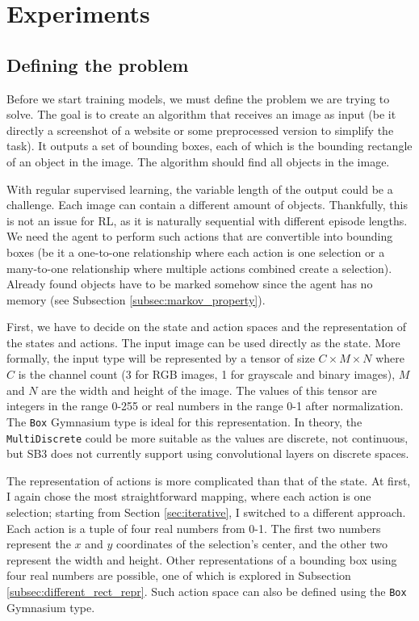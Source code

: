\documentclass[
  digital,     %
  oneside,     %
  nosansbold,  %
  nocolorbold, %
  lof,         %
  lot,         %
]{fithesis4}
\begin{document}
\chapter{Experiments}

\section{Defining the problem}
\label{sec:problem_definition}

Before we start training models, we must define the problem we are trying to solve. The goal is to create an algorithm that receives an image as input (be it directly a screenshot of a website or some preprocessed version to simplify the task). It outputs a set of bounding boxes, each of which is the bounding rectangle of an object in the image. The algorithm should find all objects in the image.

With regular supervised learning, the variable length of the output could be a challenge. Each image can contain a different amount of objects. Thankfully, this is not an issue for RL, as it is naturally sequential with different episode lengths. We need the agent to perform such actions that are convertible into bounding boxes (be it a one-to-one relationship where each action is one selection or a many-to-one relationship where multiple actions combined create a selection). Already found objects have to be marked somehow since the agent has no memory (see Subsection \ref{subsec:markov_property}).

First, we have to decide on the state and action spaces and the representation of the states and actions. The input image can be used directly as the state. More formally, the input type will be represented by a tensor of size $C\times M \times N$ where $C$ is the channel count (3 for RGB images, 1 for grayscale and binary images), $M$ and $N$ are the width and height of the image. The values of this tensor are integers in the range 0-255 or real numbers in the range 0-1 after normalization. The \texttt{Box} Gymnasium type is ideal for this representation. In theory, the \texttt{MultiDiscrete} could be more suitable as the values are discrete, not continuous, but SB3 does not currently support using convolutional layers on discrete spaces.

The representation of actions is more complicated than that of the state. At first, I again chose the most straightforward mapping, where each action is one selection; starting from Section \ref{sec:iterative}, I switched to a different approach. Each action is a tuple of four real numbers from 0-1. The first two numbers represent the $x$ and $y$ coordinates of the selection's center, and the other two represent the width and height. Other representations of a bounding box using four real numbers are possible, one of which is explored in Subsection \ref{subsec:different_rect_repr}. Such action space can also be defined using the \texttt{Box} Gymnasium type.
\end{document}

